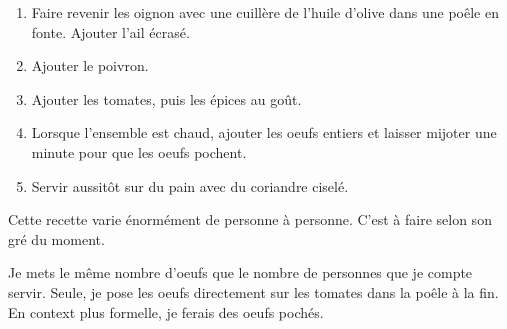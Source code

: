 
\begin{ingredients}
\end{ingredients}


\begin{recipe}
  \begin{enumerate}

  \item Faire revenir les oignon avec une cuillère de l'huile d'olive
    dans une poêle en fonte.  Ajouter l'ail écrasé.

  \item Ajouter le poivron.

  \item Ajouter les tomates, puis les épices au goût.

  \item Lorsque l'ensemble est chaud, ajouter les oeufs entiers et
    laisser mijoter une minute pour que les oeufs pochent.

  \item Servir aussitôt sur du pain avec du coriandre ciselé.

  \end{enumerate}
\end{recipe}


Cette recette varie énormément de personne à personne.  C'est à faire selon son gré du moment.

Je mets le même nombre d'oeufs que le nombre de personnes que je
compte servir.  Seule, je pose les oeufs directement sur les tomates
dans la poêle à la fin.  En context plus formelle, je ferais des oeufs
pochés.
